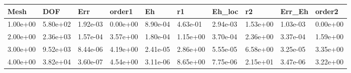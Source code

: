 \begin{tabular}{llllllllll}
Mesh & DOF & Err & order1 & Eh & r1 & Eh_loc & r2 & Err_Eh & order2 \\ 
\hline 
1.00e+00 & 5.80e+02 & 1.92e-03 & 0.00e+00 & 8.90e-04 & 4.63e-01 & 2.94e-03 & 1.53e+00 & 1.03e-03 & 0.00e+00 \\ 
2.00e+00 & 2.36e+03 & 1.57e-04 & 3.57e+00 & 1.80e-04 & 1.15e+00 & 3.70e-04 & 2.36e+00 & 3.37e-04 & 1.59e+00 \\ 
3.00e+00 & 9.52e+03 & 8.44e-06 & 4.19e+00 & 2.41e-05 & 2.86e+00 & 5.55e-05 & 6.58e+00 & 3.25e-05 & 3.35e+00 \\ 
4.00e+00 & 3.82e+04 & 3.60e-07 & 4.54e+00 & 3.11e-06 & 8.65e+00 & 7.75e-06 & 2.15e+01 & 3.47e-06 & 3.22e+00 \\ 
\hline 
\end{tabular}